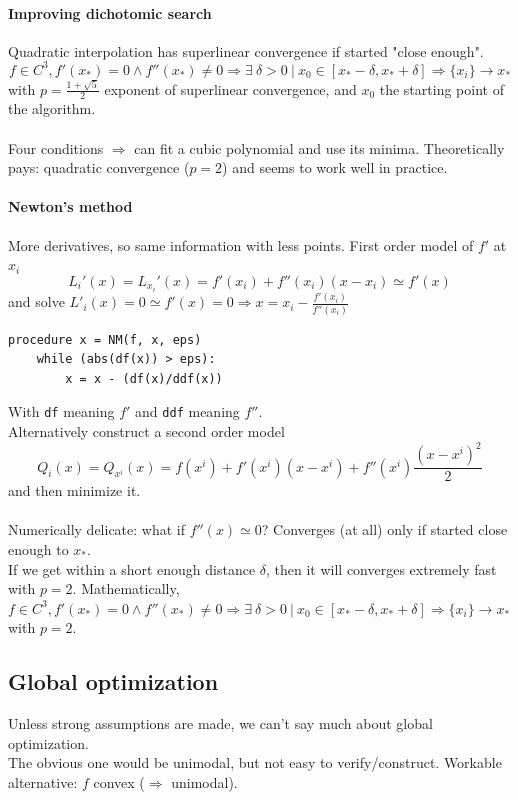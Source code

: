 \documentclass[10pt]{report}
\begin{document}
\paragraph{Improving dichotomic search} Quadratic interpolation has superlinear convergence if started "close enough".\\
$$f\in C^3, f'(x_*) = 0 \wedge f''(x_*)\neq 0 \Rightarrow \exists\:\delta > 0\:|\:x_0 \in [x_* - \delta, x_* + \delta] \Rightarrow \{x_i\} \rightarrow x_*$$ with $p = \frac{1 + \sqrt{5}}{2}$ exponent of superlinear convergence, and $x_0$ the starting point of the algorithm.\\\\
Four conditions $\Rightarrow$ can fit a cubic polynomial and use its minima. Theoretically pays: quadratic convergence ($p = 2$) and seems to work well in practice.
\paragraph{Newton's method} More derivatives, so same information with less points. First order model of $f'$ at $x_i$ $$L_i'(x) = L_{x_i}'(x) = f'(x_i) + f''(x_i)(x-x_i)\simeq f'(x)$$ and solve $L'_i(x) = 0 \simeq f'(x) = 0 \Rightarrow x = x_i-\frac{f'(x_i)}{f''(x_i)}$
\begin{lstlisting}[style=myPython]
procedure x = NM(f, x, eps)
	while (abs(df(x)) > eps):
		x = x - (df(x)/ddf(x))
\end{lstlisting}
With \texttt{df} meaning $f'$ and \texttt{ddf} meaning $f''$.\\
Alternatively construct a second order model $$Q_i(x) = Q_{x^i}(x) = f(x^i) + f'(x^i)(x - x^i) + f''(x^i)\frac{(x - x^i)^2}{2}$$ and then minimize it.\\\\
Numerically delicate: what if $f''(x) \simeq 0$? Converges (at all) only if started close enough to $x_*$.\\
If we get within a short enough distance $\delta$, then it will converges extremely fast with $p = 2$. Mathematically, $f\in C^3, f'(x_*) = 0 \wedge f''(x_*)\neq 0\Rightarrow \exists\:\delta>0\:|\:x_0\in[x_*-\delta, x_*+\delta]\Rightarrow \{x_i\} \rightarrow x_*$ with $p = 2$.
\pagebreak
\subsection{Global optimization} Unless strong assumptions are made, we can't say much about global optimization.\\
The obvious one would be unimodal, but not easy to verify/construct. Workable alternative: $f$ convex ($\Rightarrow$ unimodal).
\end{document}
